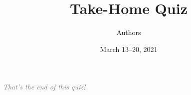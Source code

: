 \documentclass[12pt]{article}
\title{Take-Home Quiz}
\author{Authors}
\date{March 13--20, 2021}
\begin{document}











\vfill
\begin{center}
\textcolor{gray}{\textit{That's the end of this quiz!}}
\end{center}
\end{document}
